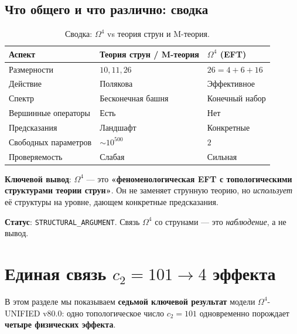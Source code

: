 \documentclass[11pt,a4paper]{article}
\newcommand{\Om}{\ensuremath{\Omega^4}}
\theoremstyle{definition}
\begin{document}
\subsection{Что общего и что различно: сводка}
\label{subsec:string-summary}

\begin{table}[ht]
\centering
\caption{Сводка: \texorpdfstring{$\Om$}{} vs теория струн и M-теория.}
\label{tab:string-final-summary}
\begin{tabular}{p{3cm}p{4cm}p{4cm}}
\toprule
Аспект & Теория струн / M-теория & $\Om$ (EFT) \\
\midrule
Размерности & $10, 11, 26$ & $26 = 4 + 6 + 16$ \\
Действие & Полякова & Эффективное \\
Спектр & Бесконечная башня & Конечный набор \\
Вершинные операторы & Есть & Нет \\
Предсказания & Ландшафт & Конкретные \\
Свободных параметров & $\sim 10^{500}$ & $2$ \\
Проверяемость & Слабая & Сильная \\
\bottomrule
\end{tabular}
\end{table}

\medskip\noindent
\textbf{Ключевой вывод}: $\Om$ --- это
\textbf{«феноменологическая EFT с топологическими структурами
теории струн»}. Он не заменяет струнную теорию, но
\emph{использует} её структуры на уровне, дающем конкретные
предсказания.

\medskip\noindent
\textbf{Статус}: \texttt{STRUCTURAL\_ARGUMENT}. Связь
$\Om$ со струнами --- это \emph{наблюдение}, а не вывод.

\section{Единая связь \texorpdfstring{$c_2 = 101 \to 4$}{c2 = 101 -> 4} эффекта}
\label{sec:unified-c2}

В этом разделе мы показываем \textbf{седьмой ключевой результат}
модели $\Om$-UNIFIED v80.0: одно топологическое число $c_2 = 101$
одновременно порождает \textbf{четыре физических эффекта}.
\end{document}
